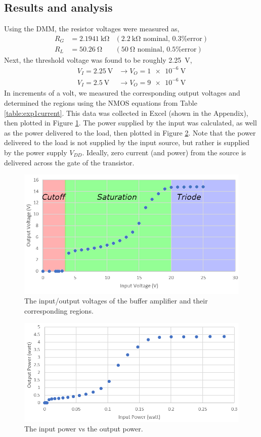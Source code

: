 \documentclass{report}
\begin{document}
\subsection{Results and analysis}
Using the DMM, the resistor voltages were measured as, \begin{align*}
	R_G & = \SI{2.1941}{\kohm} & (\SI{2.2}{\kohm}\text{ nominal, 0.3\% error}) \\
	R_{L} & = \SI{50.26}{\ohm} & (\SI{50}{\ohm}\text{ nominal, 0.5\% error})
\end{align*}
Next, the threshold voltage was found to be roughly \SI{2.25}{\V}, \begin{align*}
	V_I = \SI{2.25}{\V} & \to V_O = \SI{1e-6}{\V} \\
	V_I = \SI{2.5}{\V} & \to V_O = \SI{9e-6}{\V}
\end{align*}
In increments of a volt, we measured the corresponding output voltages and determined the regions using the NMOS equations from Table \ref{table:exp1current}. This data was collected in Excel (shown in the Appendix), then plotted in Figure \ref{fig:exp3regions}. The power supplied by the input was calculated, as well as the power delivered to the load, then plotted in Figure \ref{fig:exp3power}. Note that the power delivered to the load is not supplied by the input source, but rather is supplied by the power supply $V_{DD}$. Ideally, zero current (and power) from the source is delivered across the gate of the transistor.
\begin{figure}[H]
	\centering
	\includegraphics[width=0.7\linewidth]{exp3regions}
	\caption{The input/output voltages of the buffer amplifier and their corresponding regions.}
	\label{fig:exp3regions}
\end{figure}
\vspace{-2em}
\begin{figure}[H]
	\centering
	\includegraphics[width=0.7\linewidth]{exp3power}
	\caption{The input power vs the output power.}
	\label{fig:exp3power}
\end{figure}
\vspace{-2.5em}
\end{document}
